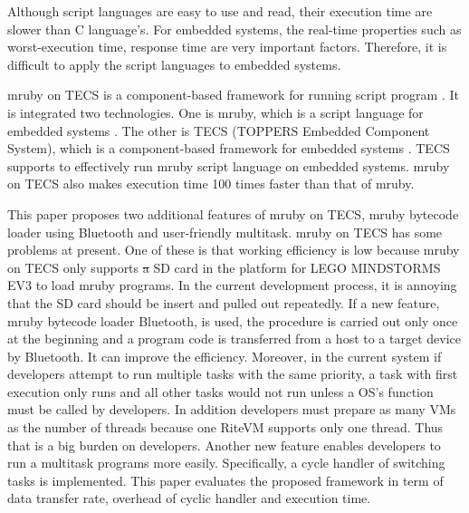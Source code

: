 \documentclass[conference,compsoc]{IEEEtran}
\providecommand{\DIFadd}[1]{{\protect\color{blue}\uwave{#1}}} %
\providecommand{\DIFdel}[1]{{\protect\color{red}\sout{#1}}}                      %
\providecommand{\DIFaddbegin}{} %
\providecommand{\DIFaddend}{} %
\providecommand{\DIFdelbegin}{} %
\providecommand{\DIFdelend}{} %
\begin{document}
Although script languages are easy to use and read, their execution time are slower than C language's.
For embedded systems, the real-time properties such as worst-execution time, response time are very important factors.
Therefore, it is difficult to apply the script languages to embedded systems.

mruby on TECS is a component-based framework for running script program \cite{7153813}.
It is integrated two technologies.
One is mruby, which is a script language for embedded systems \cite{5959588}.
The other is TECS (TOPPERS Embedded Component System), which is a component-based framework for embedded systems \cite{4208825}.
TECS supports to effectively run mruby script language on embedded systems.
mruby on TECS also makes execution time 100 times faster than that of mruby.

This paper proposes two additional features of mruby on TECS, mruby bytecode loader using Bluetooth and user-friendly multitask.
mruby on TECS has some problems at present.
One of these is that working efficiency is low because mruby on TECS only supports \DIFdelbegin \DIFdel{a }\DIFdelend \DIFaddbegin \DIFadd{an }\DIFaddend SD card in the platform for LEGO MINDSTORMS EV3 to load mruby programs.
In the current development process, it is annoying that the SD card should be insert and pulled out repeatedly.
If a new feature, mruby bytecode loader Bluetooth, is used, the procedure is carried out only once at the beginning and a program code is transferred from a host to a target device by Bluetooth.
It can improve the efficiency.
Moreover, in the current system if developers attempt to run multiple tasks with the same priority, a task with first execution only runs and all other tasks would not run unless a OS's function must be called by developers.
In addition developers must prepare as many VMs as the number of threads because one RiteVM supports only one thread.
Thus that is a big burden on developers.
Another new feature enables developers to run a multitask programs more easily.
Specifically, a cycle handler of switching tasks is implemented.
This paper evaluates the proposed framework in term of data transfer rate, overhead of cyclic handler and execution time.
\end{document}
